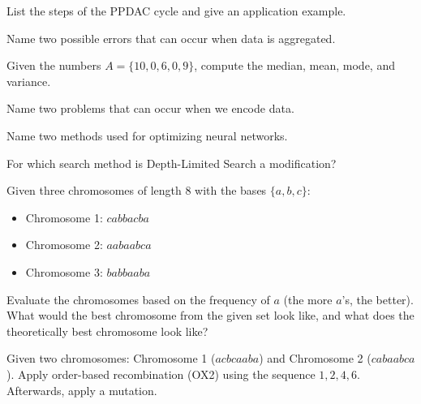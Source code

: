 \documentclass[12pt]{article}
\begin{document}
    \begin{ejercicio}
        List the steps of the PPDAC cycle and give an application example.
    \end{ejercicio}

    \begin{ejercicio}
        Name two possible errors that can occur when data is aggregated.
    \end{ejercicio}

    \begin{ejercicio}
        Given the numbers $A = \{10, 0, 6, 0, 9\}$, compute the median, mean, mode, and variance.
    \end{ejercicio}

    \begin{ejercicio}
        Name two problems that can occur when we encode data.
    \end{ejercicio}

    \begin{ejercicio}
        Name two methods used for optimizing neural networks.
    \end{ejercicio}

    \begin{ejercicio}
        For which search method is Depth-Limited Search a modification?
    \end{ejercicio}

    \begin{ejercicio}
        Given three chromosomes of length $8$ with the bases $\{a, b, c\}$:
        \begin{itemize}
            \item Chromosome 1: $cabbacba$
            \item Chromosome 2: $aabaabca$
            \item Chromosome 3: $babbaaba$
        \end{itemize}
        Evaluate the chromosomes based on the frequency of $a$ (the more $a$'s, the better). What would the best chromosome from the given set look like, and what does the theoretically best chromosome look like?
    \end{ejercicio}

    \begin{ejercicio}
        Given two chromosomes: Chromosome 1 ($acbcaaba$) and Chromosome 2 ($cabaabca$). Apply order-based recombination (OX2) using the sequence $1,2,4,6$. Afterwards, apply a mutation.
    \end{ejercicio}
\end{document}
